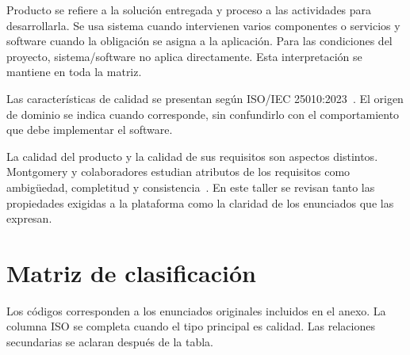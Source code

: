 \documentclass[11pt,a4paper]{article}
\begin{document}
Producto se refiere a la solución entregada y proceso a las
actividades para desarrollarla. Se usa sistema cuando intervienen
varios componentes o servicios y software cuando la obligación se
asigna a la aplicación. Para las condiciones del proyecto,
sistema/software no aplica directamente. Esta interpretación se
mantiene en toda la matriz.

Las características de calidad se presentan según
ISO/IEC 25010:2023~\cite{iso}. El origen de dominio se indica cuando
corresponde, sin confundirlo con el comportamiento que debe
implementar el software.

La calidad del producto y la calidad de sus requisitos son aspectos
distintos. Montgomery y colaboradores estudian atributos de los
requisitos como ambigüedad, completitud y
consistencia~\cite{montgomery2022}. En este taller se revisan tanto
las propiedades exigidas a la plataforma como la claridad de los
enunciados que las expresan.

\clearpage
\section{Matriz de clasificación}

Los códigos corresponden a los enunciados originales incluidos en
el anexo. La columna ISO se completa cuando el tipo principal es
calidad. Las relaciones secundarias se aclaran después de la tabla.
\end{document}
